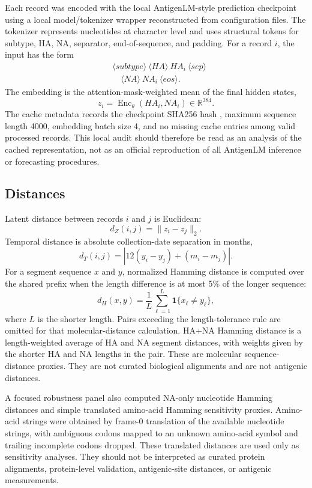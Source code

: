 \documentclass[11pt]{article}
\newcommand{\Enc}{\operatorname{Enc}}
\newcommand{\R}{\mathbb{R}}
\begin{document}
Each record was encoded with the local AntigenLM-style prediction checkpoint  using a local model/tokenizer wrapper reconstructed from configuration files. The tokenizer represents nucleotides at character level and uses structural tokens for subtype, HA, NA, separator, end-of-sequence, and padding. For a record $i$, the input has the form
\[
\begin{aligned}
&\langle subtype\rangle \ \langle HA\rangle \ HA_i \ \langle sep\rangle \\
&\quad \langle NA\rangle \ NA_i \ \langle eos\rangle .
\end{aligned}
\]
The embedding is the attention-mask-weighted mean of the final hidden states,
\[
z_i=\Enc_{\theta}(HA_i,NA_i)\in\R^{384}.
\]
The cache metadata records the checkpoint SHA256 hash
, maximum sequence length 4000, embedding batch size 4, and no missing cache entries among valid processed records. This local audit should therefore be read as an analysis of the cached representation, not as an official reproduction of all AntigenLM inference or forecasting procedures.

\subsection{Distances}

Latent distance between records $i$ and $j$ is Euclidean:
\[
d_Z(i,j)=\lVert z_i-z_j\rVert_2.
\]
Temporal distance is absolute collection-date separation in months,
\[
d_T(i,j)=\left|12(y_i-y_j)+(m_i-m_j)\right|.
\]
For a segment sequence $x$ and $y$, normalized Hamming distance is computed over the shared prefix when the length difference is at most 5\% of the longer sequence:
\[
d_H(x,y)=\frac{1}{L}\sum_{\ell=1}^{L}\mathbf{1}\{x_\ell\neq y_\ell\},
\]
where $L$ is the shorter length. Pairs exceeding the length-tolerance rule are omitted for that molecular-distance calculation. HA+NA Hamming distance is a length-weighted average of HA and NA segment distances, with weights given by the shorter HA and NA lengths in the pair. These are molecular sequence-distance proxies. They are not curated biological alignments and are not antigenic distances.

A focused robustness panel also computed NA-only nucleotide Hamming distances and simple translated amino-acid Hamming sensitivity proxies. Amino-acid strings were obtained by frame-0 translation of the available nucleotide strings, with ambiguous codons mapped to an unknown amino-acid symbol and trailing incomplete codons dropped. These translated distances are used only as sensitivity analyses. They should not be interpreted as curated protein alignments, protein-level validation, antigenic-site distances, or antigenic measurements.
\end{document}
